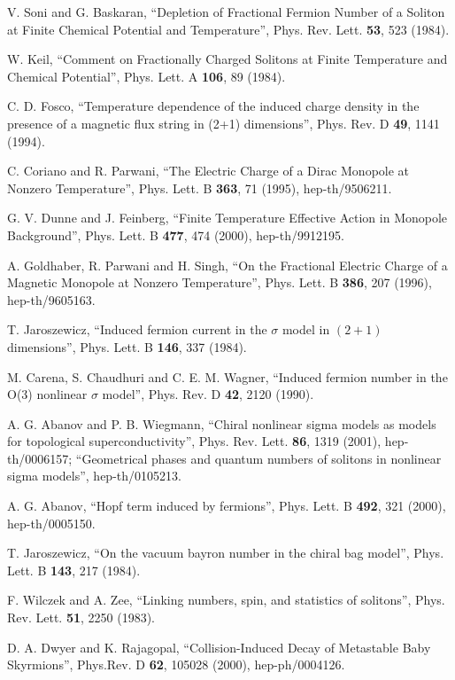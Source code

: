 \documentclass[a4paper,prd]{revtex4}
\begin{document}
\begin{thebibliography}{99}
 V.  Soni and G.  Baskaran,  ``Depletion of Fractional Fermion
Number of a Soliton at Finite Chemical  Potential and Temperature'',  Phys. 
Rev.  Lett.  {\bf 53}, 523 (1984). 

 W.  Keil,  ``Comment on Fractionally Charged Solitons at
Finite  Temperature and Chemical Potential'',  Phys.  Lett.  A {\bf 106}, 
89 (1984).

 C. D. Fosco, ``Temperature dependence of the
induced charge density in the presence of a magnetic flux string in (2+1)
dimensions'', Phys. Rev. D {\bf 49}, 1141 (1994). 
   

 C.  Coriano and R.  Parwani,  ``The Electric Charge of a Dirac 
Monopole at Nonzero Temperature'',  Phys.  Lett.  B {\bf 363}, 71 (1995),
hep-th/9506211. 

 G. V. Dunne and J.  Feinberg,  ``Finite Temperature Effective 
Action in Monopole Background'',  Phys.  Lett.  B {\bf 477}, 474 (2000),
hep-th/9912195.

 A.  Goldhaber,  R.  Parwani and H.  Singh,  ``On the
Fractional Electric Charge of a Magnetic Monopole at Nonzero Temperature'', 
Phys.  Lett.  B {\bf 386}, 207 (1996), hep-th/9605163.

 T. Jaroszewicz, ``Induced fermion current in the $\sigma$ model in
$(2+1)$ dimensions'', Phys. Lett. B {\bf 146}, 337 (1984).

 M. Carena, S. Chaudhuri and C. E. M. Wagner, ``Induced fermion
number in the O(3) nonlinear $\sigma$ model'', Phys. Rev. D {\bf 42}, 2120
(1990).

 A. G. Abanov and P. B. Wiegmann, ``Chiral nonlinear
sigma models as models for topological superconductivity'', 
Phys. Rev. Lett. {\bf 86}, 1319 (2001), hep-th/0006157;
``Geometrical phases and quantum numbers of solitons in nonlinear 
sigma models'', hep-th/0105213.

 A. G. Abanov, ``Hopf term induced by fermions'',
Phys. Lett. B {\bf 492}, 321 (2000), hep-th/0005150. 

 T. Jaroszewicz, ``On the vacuum bayron number in the chiral bag
model'', Phys. Lett. B {\bf 143}, 217 (1984).

 F. Wilczek and A. Zee, ``Linking numbers, spin, and statistics
of solitons'', Phys. Rev. Lett. {\bf 51}, 2250 (1983).

  D. A. Dwyer and K. Rajagopal, ``Collision-Induced Decay
of Metastable Baby Skyrmions'', Phys.Rev. D {\bf 62}, 105028 (2000),
hep-ph/0004126.
 

\end{thebibliography}
\end{document}
